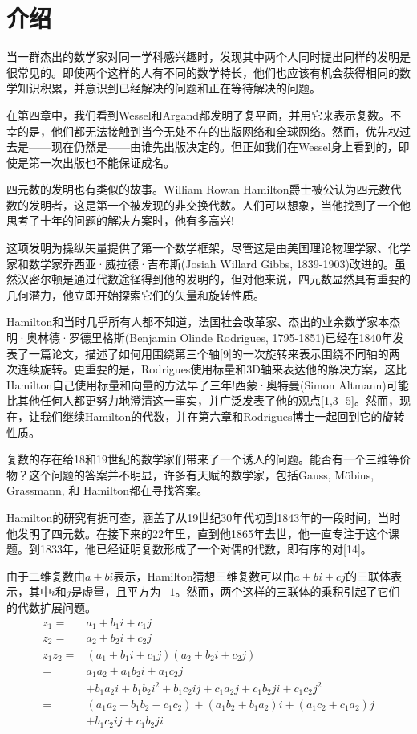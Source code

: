 
\section{介绍}
当一群杰出的数学家对同一学科感兴趣时，发现其中两个人同时提出同样的发明是很常见的。即使两个这样的人有不同的数学特长，他们也应该有机会获得相同的数学知识积累，并意识到已经解决的问题和正在等待解决的问题。

在第四章中，我们看到Wessel和Argand都发明了复平面，并用它来表示复数。不幸的是，他们都无法接触到当今无处不在的出版网络和全球网络。然而，优先权过去是——现在仍然是——由谁先出版决定的。但正如我们在Wessel身上看到的，即使是第一次出版也不能保证成名。

四元数的发明也有类似的故事。William Rowan Hamilton爵士被公认为四元数代数的发明者，这是第一个被发现的非交换代数。人们可以想象，当他找到了一个他思考了十年的问题的解决方案时，他有多高兴!

这项发明为操纵矢量提供了第一个数学框架，尽管这是由美国理论物理学家、化学家和数学家乔西亚·威拉德·吉布斯(Josiah Willard Gibbs, 1839-1903)改进的。虽然汉密尔顿是通过代数途径得到他的发明的，但对他来说，四元数显然具有重要的几何潜力，他立即开始探索它们的矢量和旋转性质。

Hamilton和当时几乎所有人都不知道，法国社会改革家、杰出的业余数学家本杰明·奥林德·罗德里格斯(Benjamin Olinde Rodrigues, 1795-1851)已经在1840年发表了一篇论文，描述了如何用围绕第三个轴[9]的一次旋转来表示围绕不同轴的两次连续旋转。更重要的是，Rodrigues使用标量和3D轴来表达他的解决方案，这比Hamilton自己使用标量和向量的方法早了三年!西蒙·奥特曼(Simon Altmann)可能比其他任何人都更努力地澄清这一事实，并广泛发表了他的观点[1,3 -5]。然而，现在，让我们继续Hamilton的代数，并在第六章和Rodrigues博士一起回到它的旋转性质。

复数的存在给18和19世纪的数学家们带来了一个诱人的问题。能否有一个三维等价物？这个问题的答案并不明显，许多有天赋的数学家，包括Gauss, Möbius, Grassmann, 和 Hamilton都在寻找答案。

Hamilton的研究有据可查，涵盖了从19世纪30年代初到1843年的一段时间，当时他发明了四元数。在接下来的22年里，直到他1865年去世，他一直专注于这个课题。到1833年，他已经证明复数形成了一个对偶的代数，即有序的对[14]。

由于二维复数由$a+b i$表示，Hamilton猜想三维复数可以由$a+b i+c j$的三联体表示，其中$i$和$j$是虚量，且平方为$-1$。然而，两个这样的三联体的乘积引起了它们的代数扩展问题。
$$
\begin{aligned}
z_{1}= & a_{1}+b_{1} i+c_{1} j \\
z_{2}= & a_{2}+b_{2} i+c_{2} j \\
z_{1} z_{2}= & \left(a_{1}+b_{1} i+c_{1} j\right)\left(a_{2}+b_{2} i+c_{2} j\right) \\
= & a_{1} a_{2}+a_{1} b_{2} i+a_{1} c_{2} j \\
& +b_{1} a_{2} i+b_{1} b_{2} i^{2}+b_{1} c_{2} i j+c_{1} a_{2} j+c_{1} b_{2} j i+c_{1} c_{2} j^{2} \\
= & \left(a_{1} a_{2}-b_{1} b_{2}-c_{1} c_{2}\right)+\left(a_{1} b_{2}+b_{1} a_{2}\right) i+\left(a_{1} c_{2}+c_{1} a_{2}\right) j \\
& +b_{1} c_{2} i j+c_{1} b_{2} j i
\end{aligned}
$$

